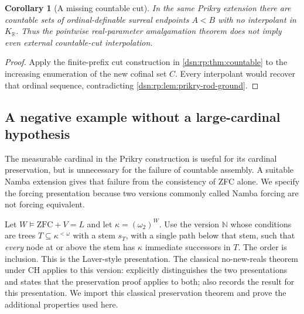 \documentclass[11pt,a4paper]{article}
\numberwithin{equation}{section}
\newtheorem{corollary}[corollary]{Corollary}
\theoremstyle{definition}
\theoremstyle{remark}
\newcommand{\R}{\mathbb R}
\newcommand{\KR}{K_{\R}}
\begin{document}
\begin{corollary}[A missing countable cut]
In the same Prikry extension there are countable sets of
ordinal-definable surreal endpoints $A<B$ with no interpolant in
$\KR$. Thus the pointwise real-parameter amalgamation theorem does
not imply even external countable-cut interpolation.
\end{corollary}
\begin{proof}
Apply the finite-prefix cut construction in \cref{dsn:rp:thm:countable} to
the increasing enumeration of the new cofinal set $C$. Every
interpolant would recover that ordinal sequence, contradicting
\cref{dsn:rp:lem:prikry-rod-ground}.
\end{proof}

\subsection{A negative example without a large-cardinal hypothesis}
\label{dsn:rp:sec:namba}

The measurable cardinal in the Prikry construction is useful for its
cardinal preservation, but is unnecessary for the failure of countable
assembly.  A suitable Namba extension gives that failure from the
consistency of ZFC alone.  We specify the forcing presentation because
two versions commonly called Namba forcing are not forcing equivalent.

Let $W\models\mathrm{ZFC}+V=L$ and let
$\kappa=(\omega_2)^W$.  Use the version $\mathbb N$ whose conditions
are trees $T\subseteq\kappa^{<\omega}$ with a stem $s_T$, with a
single path below that stem, such that \emph{every} node at or above
the stem has $\kappa$ immediate successors in $T$.  The order is
inclusion.  This is the Laver-style presentation.  The classical
no-new-reals theorem under CH applies to this version:
\cite{LietzNamba2024} explicitly distinguishes the two presentations
and states that the preservation proof applies to both;
\cite[Theorem~23 and the comparison table on p.~4]{MillerForcing2009}
also records the result for this presentation.  We import this
classical preservation theorem and prove the additional properties
used here.
\end{document}
